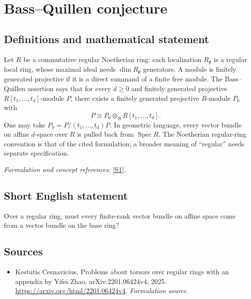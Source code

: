 \documentclass[11pt]{article}
\begin{document}
\section*{\texorpdfstring{Bass–Quillen conjecture}{Bass–Quillen conjecture}}\label{statement}
\subsection{Definitions and mathematical statement}
Let $R$ be a commutative regular Noetherian ring: each localization $R_{\mathfrak p}$ is a regular local ring, whose maximal ideal needs $\dim R_{\mathfrak p}$ generators. A module is finitely generated projective if it is a direct summand of a finite free module. The Bass--Quillen assertion says that for every $d\ge0$ and finitely generated projective $R[t_1,\ldots,t_d]$-module $P$, there exists a finitely generated projective $R$-module $P_0$ with
\[
 P\cong P_0\otimes_R R[t_1,\ldots,t_d].
\]
One may take $P_0=P/(t_1,\ldots,t_d)P$. In geometric language, every vector bundle on affine $d$-space over $R$ is pulled back from $\operatorname{Spec}R$. The Noetherian regular-ring convention is that of the cited formulation; a broader meaning of ``regular'' needs separate specification.
\par\smallskip\textit{Formulation and concept references:} \href{https://arxiv.org/html/2201.06424v4}{[S1]}.

\subsection{Short English statement}
Over a regular ring, must every finite-rank vector bundle on affine space come from a vector bundle on the base ring?
\subsection{Sources}
\begin{itemize}
\item[S1]Kestutis Cesnavicius, Problems about torsors over regular rings with an appendix by Yifei Zhao, arXiv:2201.06424v4, 2025.
\url{https://arxiv.org/html/2201.06424v4}.
\textit{Formulation source.}
\end{itemize}
\end{document}
